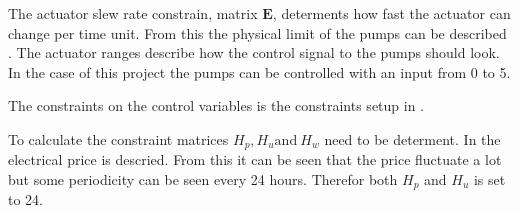 The actuator slew rate constrain, matrix $\pmb{E}$, determents how fast the actuator can change per time unit. From this the physical limit of the pumps can be described . The actuator ranges describe how the control signal to the pumps should look. In the case of this project the pumps can be controlled with an input from 0 to 5. 

The constraints on the control variables is the constraints setup in . 



To calculate the constraint matrices $H_p, H_u \text{and} \: H_w$ need to be determent. In  the electrical price is descried. From this it can be seen that the price fluctuate a lot but some periodicity can be seen every 24 hours. Therefor both $H_p$ and $ H_u $ is set to 24. 




